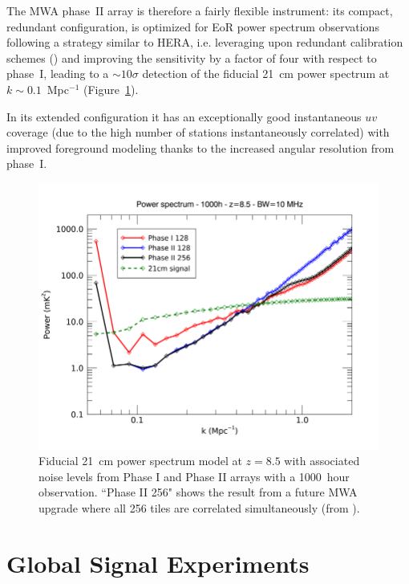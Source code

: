 The MWA phase~II array is therefore a fairly flexible instrument: its compact, redundant configuration, is optimized for EoR power spectrum observations following a strategy similar to HERA, i.e. leveraging upon redundant calibration schemes (\cite{li18}) and improving the sensitivity by a factor of four with respect to phase~I, leading to a $\sim 10\sigma$ detection of the fiducial 21~cm power spectrum at $k \sim 0.1$~Mpc$^{-1}$ (Figure~\ref{fig:fig_mwa_phaseII_pspec}).

In its extended configuration it has an exceptionally good instantaneous $uv$ coverage (due to the high number of stations instantaneously correlated) with improved foreground modeling thanks to the increased angular resolution from phase~I.
%
\begin{figure}[t]
\begin{center}
\includegraphics[width=0.8.\textwidth]{Koopmans_Bernardi/mwa_phaseII_pspec.png}
\end{center}
\caption{Fiducial 21~cm power spectrum model at $z = 8.5$ with associated noise levels from Phase I and Phase II arrays with a 1000~hour observation. ``Phase II 256" shows the result from a future MWA upgrade where all 256 tiles are correlated simultaneously (from \cite{wayth18}).}
\label{fig:fig_mwa_phaseII_pspec}
\end{figure}






\section{Global Signal Experiments}

